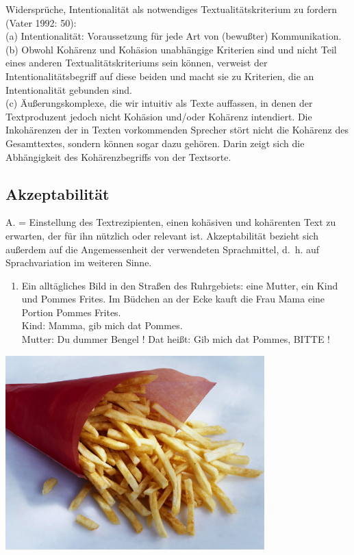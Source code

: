 \documentclass[
  letterpaper,
]{scrbook}
\providecommand{\tightlist}{%
  \setlength{\itemsep}{0pt}\setlength{\parskip}{0pt}}\usepackage{longtable,booktabs,array}
\begin{document}
Widersprüche, Intentionalität als notwendiges Textualitätskriterium zu
fordern (Vater 1992: 50):\\
(a) Intentionalität: Voraussetzung für jede Art von (bewußter)
Kommunikation.\\
(b) Obwohl Kohärenz und Kohäsion unabhängige Kriterien sind und nicht
Teil eines anderen Textualitätskriteriums sein können, verweist der
Intentionalitätsbegriff auf diese beiden und macht sie zu Kriterien, die
an Intentionalität gebunden sind.\\
(c) Äußerungskomplexe, die wir intuitiv als Texte auffassen, in denen
der Textproduzent jedoch nicht Kohäsion und/oder Kohärenz intendiert.
Die Inkohärenzen der in Texten vorkommenden Sprecher stört nicht die
Kohärenz des Gesamttextes, sondern können sogar dazu gehören. Darin
zeigt sich die Abhängigkeit des Kohärenzbegriffs von der Textsorte.

\hypertarget{akzeptabilituxe4t}{%
\subsection{Akzeptabilität}\label{akzeptabilituxe4t}}

A. = Einstellung des Textrezipienten, einen kohäsiven und kohärenten
Text zu erwarten, der für ihn nützlich oder relevant ist. Akzeptabilität
bezieht sich außerdem auf die Angemessenheit der verwendeten
Sprachmittel, d.~h. auf Sprachvariation im weiteren Sinne.

\begin{enumerate}
\def\labelenumi{(\arabic{enumi})}
\setcounter{enumi}{11}
\tightlist
\item
  Ein alltägliches Bild in den Straßen des Ruhrgebiets: eine Mutter, ein
  Kind und Pommes Frites. Im Büdchen an der Ecke kauft die Frau Mama
  eine Portion Pommes Frites.\\
  Kind: Mamma, gib mich dat Pommes.\\
  Mutter: Du dummer Bengel ! Dat heißt: Gib mich dat Pommes, BITTE !
\end{enumerate}

\includegraphics[width=0.75\textwidth,height=\textheight]{./pictures/textkriterien_8.jpg}
\end{document}
